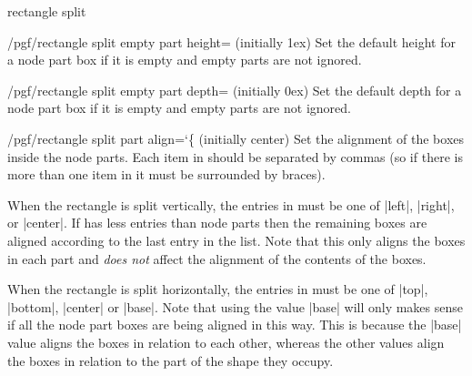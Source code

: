 \begin{shape}{rectangle split}
  \begin{key}{/pgf/rectangle split empty part height= (initially 1ex)}
    Set the default height for a node part box if it is empty and
    empty parts are not ignored.
  \end{key}

  \begin{key}{/pgf/rectangle split empty part depth= (initially 0ex)}
    Set the default depth for a node part box if it is empty and
    empty parts are not ignored.
  \end{key}

  \begin{key}{/pgf/rectangle split part align={\ttfamily\char`\{} (initially center)}
  	Set the alignment of the boxes inside the node parts.
  	Each item in  should be
  	separated by commas (so if there is more than one item in
  	 it must be surrounded by braces).
  	
  	When the rectangle is split vertically, the entries in 
  	must be one of |left|, |right|, or |center|. If  has less
  	entries than node parts then the remaining boxes are aligned
  	according to the last entry in the list.
    Note that this only aligns the boxes in each part and \emph{does not}
    affect the alignment of the contents of the boxes.

\begin{codeexample}[]
\def\x{one \nodepart{two} 2 \nodepart{three} three \nodepart{four} 4}
\end{codeexample}

 	When the rectangle is split horizontally, the entries in 
	must be one of |top|, |bottom|, |center| or |base|. Note that using
	the value |base| will only makes sense if all the node part boxes are
	being	aligned in this way. This is because the |base| value aligns
	the boxes in relation to each other, whereas the other values align
	the boxes in relation to the part of the shape they occupy.


\begin{codeexample}[]
\def\x{\Large w\nodepart{two}x\nodepart{three}\Huge y\nodepart{four}\tiny z}
\end{codeexample}


\end{key}
\end{shape}
